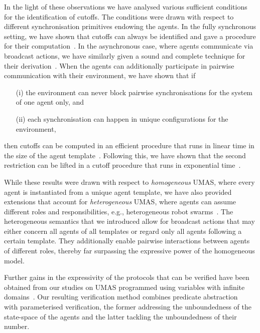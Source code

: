 \documentclass{article}
\begin{document}
In the light of these observations we have analysed various sufficient
conditions for the identification of cutoffs. The conditions were drawn with
respect to different  synchronisation primitives endowing the agents.  In the
fully synchronous setting, we have shown that cutoffs can always be identified
and gave a procedure for their computation~\cite{KouvarosLomuscio15b}.  In the
asynchronous case, where agents communicate via broadcast actions, we have
similarly given a sound and complete technique for their
derivation~\cite{KouvarosLomuscio13a}. When the agents can additionally
participate in pairwise communication with their environment, we have shown
that if 
\begin{itemize}
    \item[(i)] the environment can never block pairwise
synchronisations for the system of one agent only, and 
\item[(ii)] each
synchronisation can happen in unique configurations for the environment,
\end{itemize} 
then  cutoffs can be computed in an efficient procedure that runs
in linear time in the size of the agent template~\cite{KouvarosLomuscio13b}.
Following this, we have shown that the second restriction can be lifted in a
cutoff procedure that runs in exponential time~\cite{KouvarosLomuscio15}. 

While these results were drawn with respect to {\em homogeneous} UMAS, where
every agent is instantiated from a unique agent template, we have also provided
extensions that account for {\em heterogeneous} UMAS, where agents can assume
different roles and responsibilities, e.g., heterogeneous robot
swarms~\cite{KouvarosLomuscio16a}. The heterogeneous semantics that we
introduced allow for broadcast actions that may either concern all agents of all
templates or regard only all agents following a certain template. They additionally enable
pairwise interactions between agents of different roles, thereby far surpassing the
expressive power of the homogeneous model.

Further gains in the expressivity of the protocols that can be verified have
been obtained from our studies on UMAS programmed using variables with infinite
domains~\cite{KouvarosLomuscio17a}. Our resulting verification method 
 combines predicate abstraction~\cite{LomuscioMichaliszyn15} with
parameterised verification, the former addressing the unboundedness of the
state-space of the agents and the latter tackling the unboundedness of their
number.  
\end{document}
